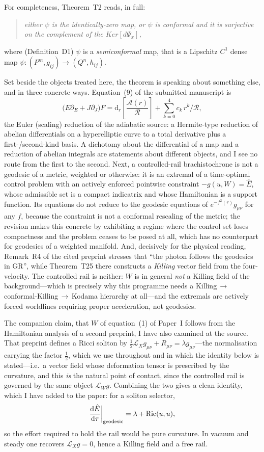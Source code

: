 \documentclass[11pt]{article}
\newenvironment{referee}
  {\begin{quote}\itshape\small}
  {\end{quote}}
\newcommand{\dd}{\mathrm{d}}
\begin{document}
For completeness, Theorem~T2 reads, in full:

\begin{referee}
either $\psi$ is the identically-zero map, or $\psi$ is conformal and it is
surjective on the complement of the $Ker[d\Psi_x]$,
\end{referee}

\noindent where (Definition~D1) $\psi$ is a \emph{semiconformal} map, that is a
Lipschitz $C^1$ dense map $\psi:(P^m,g_{ij})\to(Q^n,h_{ij})$.

Set beside the objects treated here, the theorem is speaking about something else,
and in three concrete ways. Equation~(9) of the submitted manuscript is
\[
  \big(E\partial_E+J\partial_J\big)F
   =\mathrm{d}_r\!\left[\frac{\mathcal A(r)}{\mathcal R}\right]
   +\sum_{k=0}^{4}c_k\,r^k/\mathcal R ,
\]
the Euler (scaling) reduction of the adiabatic source: a Hermite-type reduction
of abelian differentials on a hyperelliptic curve to a total derivative plus a
first-/second-kind basis. A dichotomy about the differential of a map and a
reduction of abelian integrals are statements about different objects, and I see no
route from the first to the second. Next, a controlled-rail brachistochrone is not a geodesic of
a metric, weighted or otherwise: it is an extremal of a time-optimal control
problem with an actively enforced pointwise constraint $-g(u,W)=\hat E$, whose
admissible set is a compact indicatrix and whose Hamiltonian is a support
function. Its equations do not reduce to the geodesic equations of
$e^{-f^2(r)}g_{\mu\nu}$ for any $f$, because the constraint is not a conformal
rescaling of the metric; the revision makes this concrete by exhibiting a regime
where the control set loses compactness and the problem ceases to be posed at
all, which has no counterpart for geodesics of a weighted manifold. And, decisively
for the physical reading, Remark~R4 of the
cited preprint stresses that ``the photon follows the geodesics in GR'', while
Theorem~T25 there constructs a \emph{Killing} vector field from the four-velocity.
The controlled rail is neither: $W$ is in general \emph{not} a Killing field of
the background---which is precisely why this programme needs a
Killing\,$\to$\,conformal-Killing\,$\to$\,Kodama hierarchy at all---and the
extremals are actively forced worldlines requiring proper acceleration, not
geodesics.

The companion claim, that $W$ of equation~(1) of Paper~I follows from the
Hamiltonian analysis of a second preprint, I have also examined at the source.
That preprint defines a Ricci soliton by
$\tfrac12\mathcal L_Xg_{\mu\nu}+R_{\mu\nu}=\lambda g_{\mu\nu}$---the normalisation
carrying the factor $\tfrac12$, which we use throughout and in which the identity
below is stated---i.e.\ a vector field whose
deformation tensor is prescribed by the curvature, and this \emph{is} the natural
point of contact, since the controlled rail is governed by the same object
$\mathcal L_Wg$. Combining the two gives a clean identity, which I have added to
the paper: for a soliton selector,
\[
   \frac{\dd\hat E}{\dd\tau}\bigg|_{\rm geodesic}=\lambda+\mathrm{Ric}(u,u),
\]
so the effort required to hold the rail would be pure curvature. In vacuum and
steady one recovers $\mathcal L_Xg=0$, hence a Killing field and a free rail.
\end{document}
